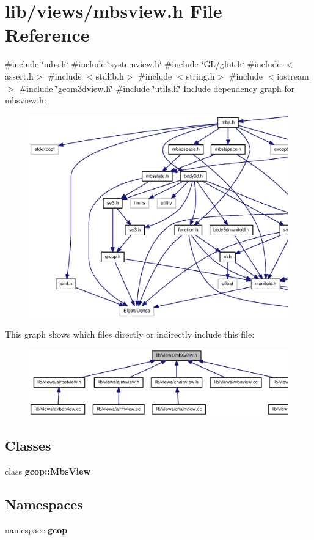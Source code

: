 \section{lib/views/mbsview.h \-File \-Reference}
\label{mbsview_8h}
{\ttfamily \#include \char`\"{}mbs.\-h\char`\"{}}\*
{\ttfamily \#include \char`\"{}systemview.\-h\char`\"{}}\*
{\ttfamily \#include \char`\"{}\-G\-L/glut.\-h\char`\"{}}\*
{\ttfamily \#include $<$assert.\-h$>$}\*
{\ttfamily \#include $<$stdlib.\-h$>$}\*
{\ttfamily \#include $<$string.\-h$>$}\*
{\ttfamily \#include $<$iostream$>$}\*
{\ttfamily \#include \char`\"{}geom3dview.\-h\char`\"{}}\*
{\ttfamily \#include \char`\"{}utils.\-h\char`\"{}}\*
\-Include dependency graph for mbsview.\-h\-:\nopagebreak
\begin{figure}[H]
\begin{center}
\leavevmode
\includegraphics[width=350pt]{mbsview_8h__incl}
\end{center}
\end{figure}
\-This graph shows which files directly or indirectly include this file\-:\nopagebreak
\begin{figure}[H]
\begin{center}
\leavevmode
\includegraphics[width=350pt]{mbsview_8h__dep__incl}
\end{center}
\end{figure}
\subsection*{\-Classes}
\begin{DoxyCompactItemize}
\item 
class {\bf gcop\-::\-Mbs\-View}
\end{DoxyCompactItemize}
\subsection*{\-Namespaces}
\begin{DoxyCompactItemize}
\item 
namespace {\bf gcop}
\end{DoxyCompactItemize}
